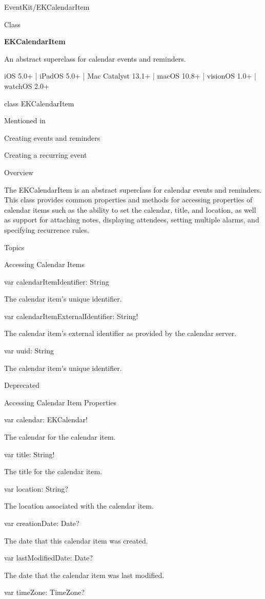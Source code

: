 \documentclass{article}
\title{}
\author{}
\date{}
\begin{document}
EventKit/EKCalendarItem

Class

\textbf{EKCalendarItem}

An abstract superclass for calendar events and reminders.

iOS 5.0+ | iPadOS 5.0+ | Mac Catalyst 13.1+ | macOS 10.8+ | visionOS 1.0+ | watchOS 2.0+

class EKCalendarItem

Mentioned in

Creating events and reminders

Creating a recurring event

Overview

The EKCalendarItem is an abstract superclass for calendar events and reminders. This class provides
common properties and methods for accessing properties of calendar items such as the ability to set the
calendar, title, and location, as well as support for attaching notes, displaying attendees, setting multiple alarms,
and specifying recurrence rules.

Topics

Accessing Calendar Items

var calendarItemIdentifier: String

The calendar item's unique identifier.

var calendarItemExternalIdentifier: String!

The calendar item's external identifier as provided by the calendar server.

var uuid: String

The calendar item's unique identifier.

Deprecated

Accessing Calendar Item Properties

var calendar: EKCalendar!

The calendar for the calendar item.

var title: String!

The title for the calendar item.

var location: String?

The location associated with the calendar item.

var creationDate: Date?

The date that this calendar item was created.

var lastModifiedDate: Date?

The date that the calendar item was last modified.

var timeZone: TimeZone?
\end{document}
